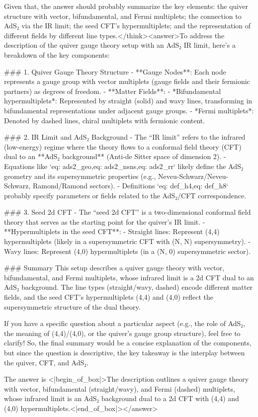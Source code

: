 Given that, the answer should probably summarize the key elements: the quiver structure with vector, bifundamental, and Fermi multiplets; the connection to AdS₂ via the IR limit; the seed CFT's hypermultiplets; and the representation of different fields by different line types.</think><answer>To address the description of the quiver gauge theory setup with an AdS₂ IR limit, here's a breakdown of the key components:  

### 1. Quiver Gauge Theory Structure  
- **Gauge Nodes**: Each node represents a gauge group with vector multiplets (gauge fields and their fermionic partners) as degrees of freedom.  
- **Matter Fields**:  
  - *Bifundamental hypermultiplets*: Represented by straight (solid) and wavy lines, transforming in bifundamental representations under adjacent gauge groups.  
  - *Fermi multiplets*: Denoted by dashed lines, chiral multiplets with fermionic content.  

### 2. IR Limit and AdS₂ Background  
- The “IR limit” refers to the infrared (low-energy) regime where the theory flows to a conformal field theory (CFT) dual to an **AdS₂ background** (Anti-de Sitter space of dimension 2).  
- Equations like `eq: ads2_geo,eq: ads2_nsns,eq: ads2_rr` likely define the AdS₂ geometry and its supersymmetric properties (e.g., Neveu-Schwarz/Neveu-Schwarz, Ramond/Ramond sectors).  
- Definitions `eq: def_h4,eq: def_h8` probably specify parameters or fields related to the AdS₂/CFT correspondence.  

### 3. Seed 2d CFT  
- The “seed 2d CFT” is a two-dimensional conformal field theory that serves as the starting point for the quiver’s IR limit.  
- **Hypermultiplets in the seed CFT**:  
  - Straight lines: Represent (4,4) hypermultiplets (likely in a supersymmetric CFT with (N, N) supersymmetry).  
  - Wavy lines: Represent (4,0) hypermultiplets (in a (N, 0) supersymmetric sector).  

### Summary  
This setup describes a quiver gauge theory with vector, bifundamental, and Fermi multiplets, whose infrared limit is a 2d CFT dual to an AdS₂ background. The line types (straight/wavy, dashed) encode different matter fields, and the seed CFT’s hypermultiplets (4,4) and (4,0) reflect the supersymmetric structure of the dual theory.  

If you have a specific question about a particular aspect (e.g., the role of AdS₂, the meaning of (4,4)/(4,0), or the quiver’s gauge group structure), feel free to clarify!  
So, the final summary would be a concise explanation of the components, but since the question is descriptive, the key takeaway is the interplay between the quiver, CFT, and AdS₂.  

The answer is <|begin_of_box|>The description outlines a quiver gauge theory with vector, bifundamental (straight/wavy), and Fermi (dashed) multiplets, whose infrared limit is an AdS₂ background dual to a 2d CFT with (4,4) and (4,0) hypermultiplets.<|end_of_box|></answer>